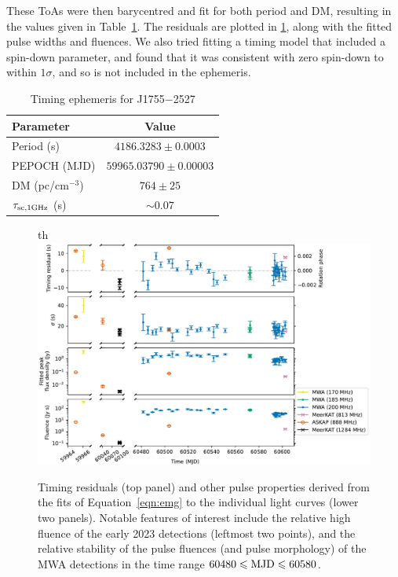 \documentclass[fleqn,usenatbib]{mnras}
\newcommand{\src}{J1755$-$2527}
\newcommand{\Tab}{Table}
\newcommand{\Eqn}{Equation}
\begin{document}
These ToAs were then barycentred and fit for both period and DM, resulting in the values given in \Tab~\ref{tbl:ephemeris}.
The residuals are plotted in \ref{fig:pulse_details}, along with the fitted pulse widths and fluences.
We also tried fitting a timing model that included a spin-down parameter, and found that it was consistent with zero spin-down to within $1\sigma$, and so is not included in the ephemeris.

\begin{table}
  \centering
  \caption{Timing ephemeris for \src{}}
  \label{tbl:ephemeris}
  \begin{tabular}{lc}
    \hline
    Parameter & Value \\
    \hline
    Period (s) & $4186.3283 \pm 0.0003$ \\
    PEPOCH (MJD) & $59965.03790 \pm 0.00003$ \\
    DM (pc/cm$^{-3}$) & $764 \pm 25$ \\
    $\tau_{\rm sc,1 GHz}$ (s) & ${\sim}0.07$ \\
    \hline
  \end{tabular}
\end{table}

\begin{figure}{th}
  \centering
  \includegraphics[width=0.98\linewidth]{pulse_details.pdf}
  \caption{Timing residuals (top panel) and other pulse properties derived from the fits of \Eqn~\ref{eqn:emg} to the individual light curves (lower two panels). Notable features of interest include the relative high fluence of the early 2023 detections (leftmost two points), and the relative stability of the pulse fluences (and pulse morphology) of the MWA detections in the time range $60480 \le {\rm MJD} \le 60580$.}
  \label{fig:pulse_details}
\end{figure}
\end{document}
